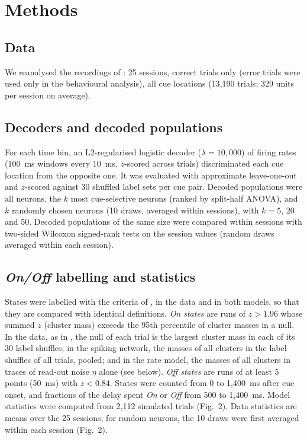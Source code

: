 \documentclass[11pt]{article}
\begin{document}
\section{Methods}

\subsection{Data}

We reanalysed the recordings of \citet{panichello2024}: 25 sessions, correct trials only (error trials were used only in the behavioural analysis), all cue locations (13,190 trials; 329 units per session on average).

\subsection{Decoders and decoded populations}

For each time bin, an L2-regularised logistic decoder ($\lambda = 10{,}000$) of firing rates (100~ms windows every 10~ms, $z$-scored across trials) discriminated each cue location from the opposite one. It was evaluated with approximate leave-one-out and $z$-scored against 30 shuffled label sets per cue pair. Decoded populations were all neurons, the $k$ most cue-selective neurons (ranked by split-half ANOVA), and $k$ randomly chosen neurons (10 draws, averaged within sessions), with $k = 5$, 20 and 50. Decoded populations of the same size were compared within sessions with two-sided Wilcoxon signed-rank tests on the session values (random draws averaged within each session).

\subsection{\emph{On/Off} labelling and statistics}

States were labelled with the criteria of \citet{panichello2024}, in the data and in both models, so that they are compared with identical definitions. \emph{On states} are runs of $z > 1.96$ whose summed $z$ (cluster mass) exceeds the 95th percentile of cluster masses in a null. In the data, as in \citet{panichello2024}, the null of each trial is the largest cluster mass in each of its 30 label shuffles; in the spiking network, the masses of all clusters in the label shuffles of all trials, pooled; and in the rate model, the masses of all clusters in traces of read-out noise $\eta$ alone (see below). \emph{Off states} are runs of at least 5 points (50~ms) with $z < 0.84$. States were counted from 0 to 1,400~ms after cue onset, and fractions of the delay spent \emph{On} or \emph{Off} from 500 to 1,400~ms. Model statistics were computed from 2,112 simulated trials (Fig.~2). Data statistics are means over the 25 sessions; for random neurons, the 10 draws were first averaged within each session (Fig.~2).
\end{document}
